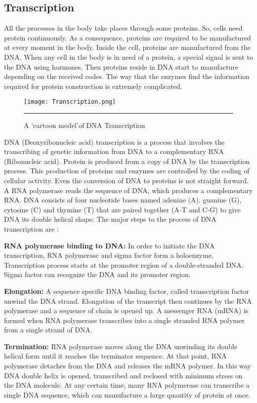 \subsection{Transcription}
All the processes in the body take places through some proteins. So, cells need protein continuously. As a consequence, proteins are required to be manufactured at every moment in the body. Inside the cell, proteins are manufactured from the DNA. When any cell in the body is in need of a protein, a special signal is sent to the DNA using hormones. Then proteins reside in DNA start to manufacture depending on the received codes. The way that the enzymes find the information required for protein construction is extremely complicated.

\begin{figure}%
	\centering
		 \texttt{[image: Transcription.png]} 
		\rule{35em}{0.5pt}
	\caption{A \lq cartoon model\rq of DNA Transcription}
	\label{fig:transcription}
\end{figure}

DNA (Deoxyribonucleic acid) transcription is a process that involves the transcribing of genetic information from DNA to a complementary RNA (Ribonucleic acid). Protein is produced from a copy of DNA by the transcription process. This production of proteins and enzymes are controlled by the coding of cellular activity. Even the conversion of DNA to proteins is not straight forward. A RNA polymerase reads the sequence of DNA, which produces a complementary RNA. DNA consists of four nucleotide bases named adenine (A), guanine (G), cytosine (C) and thymine (T) that are paired together (A-T and C-G) to give DNA its double helical shape. The major steps to the process of DNA transcription are :

\textbf{RNA polymerase binding to DNA:} In order to initiate the DNA transcription, RNA polymerase and sigma factor form a holoenzyme. Transcription process starts at the promoter region of a double-stranded DNA. Sigma factor can recognize the DNA and its promoter region. 

\textbf{Elongation:} A sequence specific DNA binding factor, called transcription factor unwind the DNA strand. Elongation of the transcript then continues by the RNA polymerase and a sequence of chain is opened up. A messenger RNA (mRNA) is formed when RNA polymerase transcribes into a single stranded RNA polymer from a single strand of DNA.

\textbf{Termination:} RNA polymerase moves along the DNA unwinding its double helical form until it reaches the terminator sequence. At that point, RNA polymerase detaches from the DNA and releases the mRNA polymer. In this way DNA double helix is opened, transcribed and reclosed with minimum stress on the DNA molecule. At any certain time, many RNA polymerase can transcribe a single DNA sequence, which can manufacture a large quantity of protein at once. 

